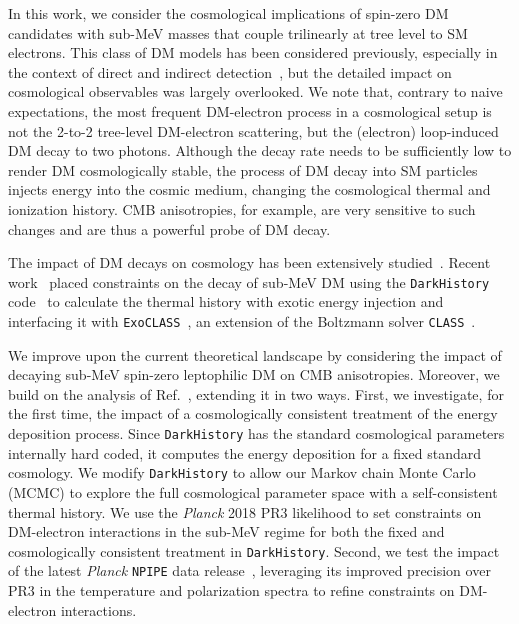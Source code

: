 In this work, we consider the cosmological implications of spin-zero DM candidates with sub-MeV masses that couple trilinearly at tree level to SM electrons.
This class of DM models has been considered previously, especially in the context of direct and indirect detection~\cite{Mitridate:2021ctr, Knapen:2017xzo,Essig:2013goa}, but the detailed impact on cosmological observables was largely overlooked.
We note that, contrary to naive expectations, the most frequent DM-electron process in a cosmological setup is not the 2-to-2 tree-level DM-electron scattering, but the (electron) loop-induced DM decay to two photons.
Although the decay rate needs to be sufficiently low to render DM cosmologically stable, the process of DM decay into SM particles injects energy into the cosmic medium, changing the cosmological thermal and ionization history.
CMB anisotropies, for example, are very sensitive to such changes and are thus a powerful probe of DM decay.

The impact of DM decays on cosmology has been extensively studied~\cite{Adams:1998nr, Chen:2003gz, 2012PhRvD..85d3522F,Slatyer:2012yq, Poulin:2016nat,Slatyer:2016qyl,Liu:2016cnk, Poulin:2016anj, Cang:2020exa, Liu:2023nct, Capozzi:2023xie, 2024arXiv240813305X}. Recent work~\cite{Capozzi:2023xie,Liu:2023nct,2024arXiv240813305X} placed constraints on the decay of sub-MeV DM using the \texttt{DarkHistory} code~\cite{Liu:2019bbm, Liu:2023fgu} to calculate the thermal history with exotic energy injection and interfacing it with \texttt{ExoCLASS}~\cite{Stocker:2018avm}, an extension of the Boltzmann solver \texttt{CLASS}~\cite{Blas:2011rf}.

We improve upon the current theoretical landscape by considering the impact of decaying sub-MeV spin-zero leptophilic DM on CMB anisotropies.
Moreover, we build on the analysis of Ref.~\cite{2024arXiv240813305X}, extending it in two ways.
First, we investigate, for the first time, the impact of a cosmologically consistent treatment of the energy deposition process.
Since \texttt{DarkHistory} has the standard cosmological parameters internally hard coded, it computes the energy deposition for a fixed standard cosmology.
We modify \texttt{DarkHistory} to allow our Markov chain Monte Carlo (MCMC) to explore the full cosmological parameter space with a self-consistent thermal history.
We use the \textit{Planck} 2018 PR3 likelihood to set constraints on DM-electron interactions in the sub-MeV regime for both the fixed and cosmologically consistent treatment in \texttt{DarkHistory}. Second, we test the impact of the latest \textit{Planck} \texttt{NPIPE} data release~\cite{Planck:2020olo}, leveraging its improved precision over PR3 in the temperature and polarization spectra to refine constraints on DM-electron interactions.

